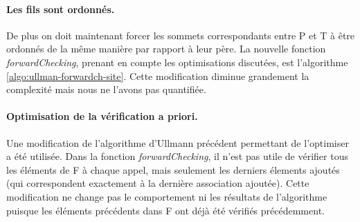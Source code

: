 
\paragraph{Les fils sont ordonnés.}
De plus on doit maintenant forcer les sommets correspondants entre P et T à être ordonnés de la même manière par rapport à leur père. 
La nouvelle fonction \emph{forwardChecking}, prenant en compte les optimisations discutées, est l'algorithme \ref{algo:ullman-forwardch-site}.
Cette modification diminue grandement la complexité mais nous ne l'avons pas quantifiée.

\paragraph{Optimisation de la vérification a priori.}
Une modification de l'algorithme d'Ullmann précédent permettant de l'optimiser a été utilisée. Dans la fonction \emph{forwardChecking}, il n'est pas utile de vérifier tous les éléments de F à chaque appel, mais seulement les derniers élements ajoutés (qui correspondent exactement à la dernière association ajoutée). Cette modification ne change pas le comportement ni les résultats de l'algorithme puisque les éléments précédents dans F ont déjà été vérifiés précédemment.

